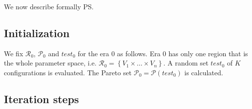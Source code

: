 We now describe formally PS.

\subsection{Initialization}
We fix $\mathcal{R}_0$, $\mathscr{P}_0$ and $test_0$ for the era $0$ as follows. Era $0$ has only one region that is the whole parameter space,
i.e. $\mathcal{R}_{0}=\left\{ V_{1}\times\dots\times V_{n}\right\} $.
A random set $test_{0}$ of $K$ configurations is evaluated. The
Pareto set $\mathscr{P}_{0}=\mathscr{P}\left(test_{0}\right)$ is
calculated.



\subsection{Iteration steps}

